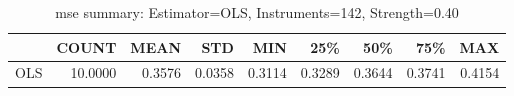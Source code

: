 \begin{table}[ht]
\centering
\caption{mse summary: Estimator=OLS, Instruments=142, Strength=0.40}
\begin{tabular}{lrrrrrrrr}
\toprule
 & COUNT & MEAN & STD & MIN & 25\% & 50\% & 75\% & MAX \\
\midrule
OLS & 10.0000 & 0.3576 & 0.0358 & 0.3114 & 0.3289 & 0.3644 & 0.3741 & 0.4154 \\
\bottomrule
\end{tabular}
\end{table}

